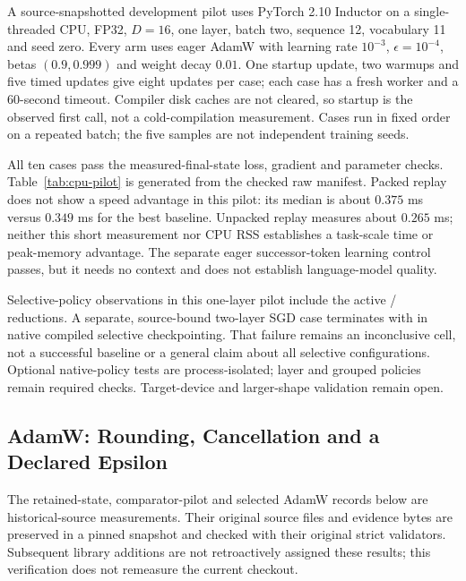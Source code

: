A source-snapshotted development pilot uses PyTorch 2.10 Inductor on a
single-threaded CPU, FP32, $D=16$, one layer, batch two, sequence 12,
vocabulary 11 and seed zero. Every arm uses eager AdamW with learning rate
$10^{-3}$, $\epsilon=10^{-4}$, betas $(0.9,0.999)$ and weight decay $0.01$.
One startup update, two warmups and five timed updates give eight updates
per case; each case has a fresh worker and a 60-second timeout. Compiler
disk caches are not cleared, so startup is the observed first call, not
a cold-compilation measurement. Cases run in fixed order on a repeated
batch; the five samples are not independent training seeds.

All ten cases pass the measured-final-state loss, gradient and parameter
checks. Table~\ref{tab:cpu-pilot} is generated from the checked raw manifest.
Packed replay does not show a speed advantage in this pilot: its median
is about $0.375$ ms versus $0.349$ ms for the best baseline. Unpacked
replay measures about $0.265$ ms; neither this short measurement nor CPU
RSS establishes a task-scale time or peak-memory advantage. The separate
eager successor-token learning control passes, but it needs no context
and does not establish language-model quality.

\begin{table}[t]
\centering
\small
\caption{Single-seed CPU development pilot, not a matched-quality or
accelerator result. All times are milliseconds; MAD is median absolute
deviation over five complete-step samples. Startup includes the first
update and any compilation/cache loading.}
\label{tab:cpu-pilot}

\end{table}

Selective-policy observations in this one-layer pilot include the active
/ reductions. A separate, source-bound two-layer
SGD case terminates with  in native compiled selective
checkpointing. That failure remains an inconclusive cell, not a successful
baseline or a general claim about all selective configurations. Optional
native-policy tests are process-isolated; layer and grouped policies
remain required checks. Target-device and larger-shape validation remain open.

\subsection{AdamW: Rounding, Cancellation and a Declared Epsilon}

The retained-state, comparator-pilot and selected AdamW records below are
historical-source measurements. Their original source files and evidence bytes
are preserved in a pinned snapshot and checked with their original strict
validators. Subsequent library additions are not retroactively assigned these
results; this verification does not remeasure the current checkout.
\label{app:optimizer-diagnostic}

